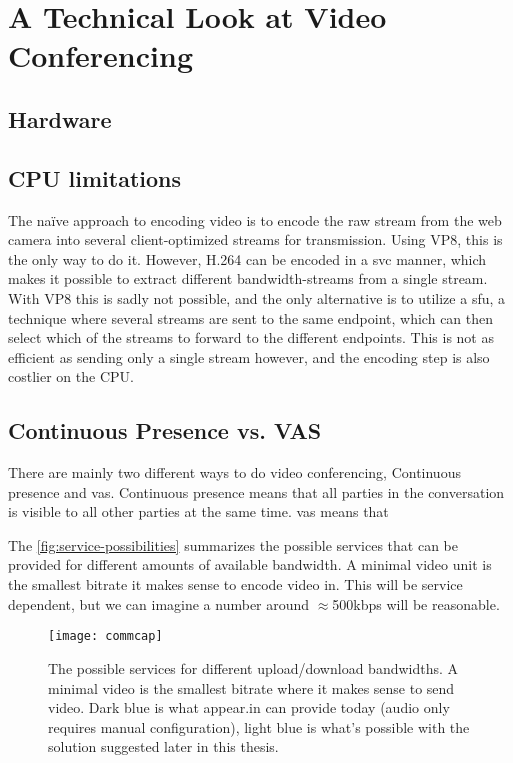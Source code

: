 \section{A Technical Look at Video Conferencing}

\subsection{Hardware}



\subsection{CPU limitations}

The naïve approach to encoding video is to encode the raw stream from the web camera into several client-optimized streams for transmission. Using VP8, this is the only way to do it. However, H.264 can be encoded in a \gls{svc} manner, which makes it possible to extract different bandwidth-streams from a single stream. With VP8 this is sadly not possible, and the only alternative is to utilize a \gls{sfu}, a technique where several streams are sent to the same endpoint, which can then select which of the streams to forward to the different endpoints. This is not as efficient as sending only a single stream however, and the encoding step is also costlier on the CPU.


\subsection{Continuous Presence vs. VAS}

There are mainly two different ways to do video conferencing, Continuous presence and \gls{vas}. Continuous presence means that all parties in the conversation is visible to all other parties at the same time. \gls{vas} means that

The \autoref{fig:service-possibilities} summarizes the possible services that can be provided for different amounts of available bandwidth. A minimal video unit is the smallest bitrate it makes sense to encode video in. This will be service dependent, but we can imagine a number around $\approx$500kbps will be reasonable.

\begin{figure}
    \centering
    \texttt{[image: commcap]}
    \caption{The possible services for different upload/download bandwidths. A minimal video is the smallest bitrate where it makes sense to send video. Dark blue is what appear.in can provide today (audio only requires manual configuration), light blue is what's possible with the solution suggested later in this thesis.}
    \label{fig:service-possibilities}
\end{figure}


